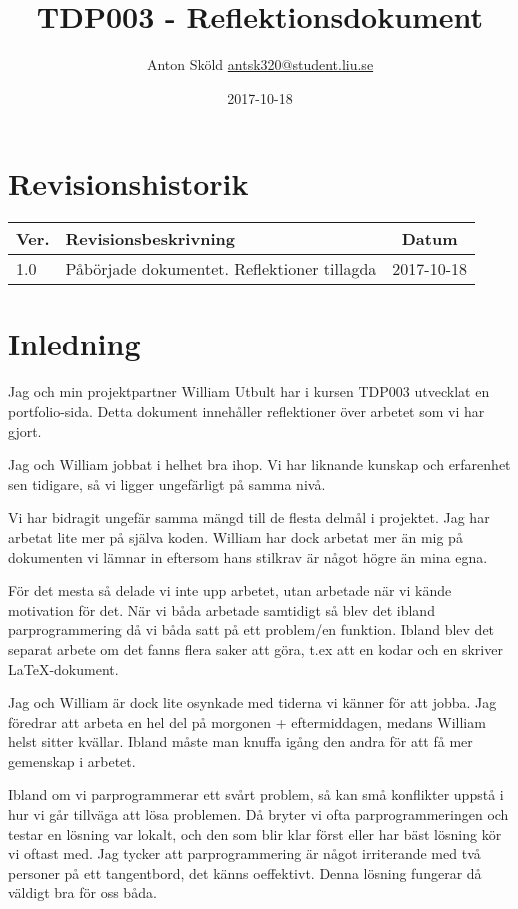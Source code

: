 \documentclass{TDP003mall}
\author{Anton Sköld \url{antsk320@student.liu.se}}
\title{TDP003 - Reflektionsdokument}
\date{2017-10-18}
\begin{document}
\projectpage
\tableofcontents

\section{Revisionshistorik}
\begin{table}[!h]
\begin{tabularx}{\linewidth}{|l|X|c|}
\hline
Ver. & Revisionsbeskrivning & Datum \\\hline
1.0 & Påbörjade dokumentet. Reflektioner tillagda & 2017-10-18\\\hline
\end{tabularx}
\end{table}

\section{Inledning}
Jag och min projektpartner William Utbult har i kursen TDP003 utvecklat en portfolio-sida. Detta dokument innehåller reflektioner över arbetet som vi har gjort.

Jag och William jobbat i helhet bra ihop. Vi har liknande kunskap och erfarenhet sen tidigare, så vi ligger ungefärligt på samma nivå.

Vi har bidragit ungefär samma mängd till de flesta delmål i projektet. Jag har arbetat lite mer på själva koden. William har dock arbetat mer än mig på dokumenten vi lämnar in eftersom hans stilkrav är något högre än mina egna.

För det mesta så delade vi inte upp arbetet, utan arbetade när vi kände motivation för det. När vi båda arbetade samtidigt så blev det ibland parprogrammering då vi båda satt på ett problem/en funktion. Ibland blev det separat arbete om det fanns flera saker att göra, t.ex att en kodar och en skriver LaTeX-dokument.

Jag och William är dock lite osynkade med tiderna vi känner för att jobba. Jag föredrar att arbeta en hel del på morgonen + eftermiddagen, medans William helst sitter kvällar. Ibland måste man knuffa igång den andra för att få mer gemenskap i arbetet.

Ibland om vi parprogrammerar ett svårt problem, så kan små konflikter uppstå i hur vi går tillväga att lösa problemen. Då bryter vi ofta parprogrammeringen och testar en lösning var lokalt, och den som blir klar först eller har bäst lösning kör vi oftast med. Jag tycker att parprogrammering är något irriterande med två personer på ett tangentbord, det känns oeffektivt. Denna lösning fungerar då väldigt bra för oss båda.
\end{document}
